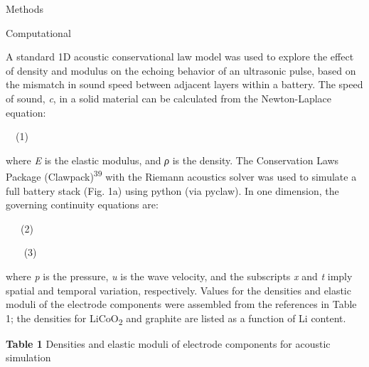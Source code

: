 \documentclass[]{article}
\begin{document}
Methods

Computational

{ }A standard 1D acoustic conservational law model was used to explore
the effect of density and modulus on the echoing behavior of an
ultrasonic pulse, based on the mismatch in sound speed between adjacent
layers within a battery. The speed of sound, \emph{c}, in a solid
material can be calculated from the Newton-Laplace equation:

~~(1)

where \emph{E} is the elastic modulus, and \emph{ρ} is the density. The
Conservation Laws Package (Clawpack)\textsuperscript{39} with the
Riemann acoustics solver was used to simulate a full battery stack (Fig.
1a) using python (via pyclaw). In one dimension, the governing
continuity equations are:

{~}~~(2)

{~~ }~(3)

where \emph{p} is the pressure, \emph{u} is the wave velocity, and the
subscripts \emph{x} and \emph{t} imply spatial and temporal variation,
respectively. Values for the densities and elastic moduli of the
electrode components were assembled from the references in Table 1; the
densities for LiCoO\textsubscript{2} and graphite are listed as a
function of Li content.

\textbf{Table 1 \textbar{}} Densities and elastic moduli of electrode
components for acoustic simulation
\end{document}
